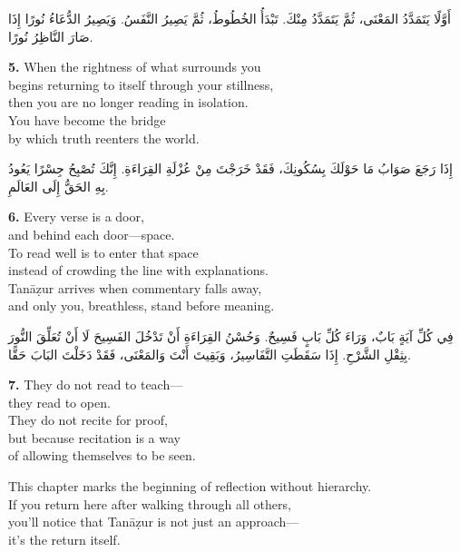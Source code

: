 \documentclass[11pt,a4paper,twoside]{book}
\begin{document}
\begin{flushright}
{\arabicfont
أَوَّلًا يَتَمَدَّدُ المَعْنَى، ثُمَّ يَتَمَدَّدُ مِنْكَ.
تَبْدَأُ الخُطُوطُ، ثُمَّ يَصِيرُ النَّفَسُ.
وَيَصِيرُ الدُّعَاءُ نُورًا إِذَا صَارَ النَّاظِرُ نُورًا.}
\end{flushright}

\vspace{1em}
{\color{indigo}\bfseries 5.}\quad
When the rightness of what surrounds you\\
begins returning to itself through your stillness,\\
then you are no longer reading in isolation.\\
You have become the bridge\\
by which truth reenters the world.

\begin{flushright}
{\arabicfont
إِذَا رَجَعَ صَوَابُ مَا حَوْلَكَ بِسُكُونِكَ،
فَقَدْ خَرَجْتَ مِنْ عُزْلَةِ القِرَاءَةِ.
إِنَّكَ تُصْبِحُ جِسْرًا يَعُودُ بِهِ الحَقُّ إِلَى العَالَمِ.}
\end{flushright}

\vspace{1em}
{\color{indigo}\bfseries 6.}\quad
Every verse is a door,\\
and behind each door—space.\\
To read well is to enter that space\\
instead of crowding the line with explanations.\\
Tanāẓur arrives when commentary falls away,\\
and only you, breathless, stand before meaning.

\begin{flushright}
{\arabicfont
فِي كُلِّ آيَةٍ بَابٌ، وَرَاءَ كُلِّ بَابٍ فَسِيحٌ.
وَحُسْنُ القِرَاءَةِ أَنْ تَدْخُلَ الفَسِيحَ
لَا أَنْ تُعَلِّقَ النُّورَ بِثِقْلِ الشَّرْحِ.
إِذَا سَقَطَتِ التَّفَاسِيرُ، وَبَقِيتَ أَنْتَ وَالمَعْنَى،
فَقَدْ دَخَلْتَ البَابَ حَقًّا.}
\end{flushright}

\vspace{1em}
{\color{indigo}\bfseries 7.}\quad
They do not read to teach—\\
they read to open.\\
They do not recite for proof,\\
but because recitation is a way\\
of allowing themselves to be seen.

This chapter marks the beginning of reflection without hierarchy.\\
If you return here after walking through all others,\\
you'll notice that Tanāẓur is not just an approach—\\
it's the return itself.
\end{document}

